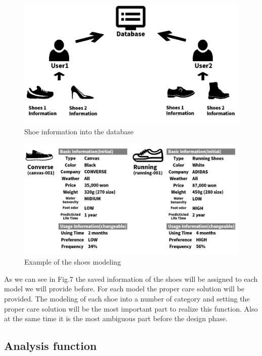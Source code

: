 \documentclass[conference]{IEEEtran}
\begin{document}
\begin{figure}[htbp]
\begin{center}
    \includegraphics[scale=0.28]{management1}
    \caption{Shoe information into the database} \label{fig:label}
\end{center}
\end{figure}
\begin{figure}[htbp]
\begin{center}
    \includegraphics[scale=0.24]{management2}
    \caption{Example of the shoes modeling } \label{fig:label}
\end{center}
\end{figure}

As we can see in Fig.7 the saved information of the shoes will be assigned to each model we will provide before. For each model the proper care solution will be provided. 
The modeling of each shoe into a number of category and setting the proper care solution will be the most important part to realize this function. Also at the same time it is the most ambiguous part before the design phase.



\subsection{Analysis function}
\end{document}
